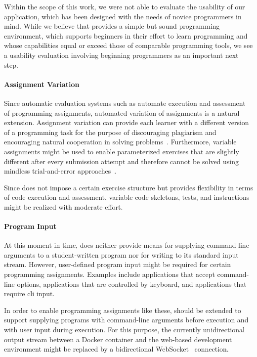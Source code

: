 Within the scope of this work, we were not able to evaluate the usability of our application, which has been designed with the needs of novice programmers in mind. While we believe that \tool provides a simple but sound programming environment, which supports beginners in their effort to learn programming and whose capabilities equal or exceed those of comparable programming tools, we see a usability evaluation involving beginning programmers as an important next step.

\paragraph{Assignment Variation}

Since automatic evaluation systems such as \tool automate execution and assessment of programming assignments, automated variation of assignments is a natural extension. Assignment variation can provide each learner with a different version of a programming task for the purpose of discouraging plagiarism and encouraging natural cooperation in solving problems~\cite{malmi2002experiences,willems2013introducing}. Furthermore, variable assignments might be used to enable parameterized exercises that are slightly different after every submission attempt and therefore cannot be solved using mindless trial-and-error approaches~\cite{ihantola2010review}.

Since \tool does not impose a certain exercise structure but provides flexibility in terms of code execution and assessment, variable code skeletons, tests, and instructions might be realized with moderate effort.

\paragraph{Program Input}

At this moment in time, \tool does neither provide means for supplying command-line arguments to a student-written program nor for writing to its standard input stream. However, user-defined program input might be required for certain programming assignments. Examples include applications that accept command-line options, applications that are controlled by keyboard, and applications that require \gls{cli} input.

In order to enable programming assignments like these, \tool should be extended to support supplying programs with command-line arguments before execution and with user input during execution. For this purpose, the currently unidirectional output stream between a Docker container and the web-based development environment might be replaced by a bidirectional WebSocket~\cite{grigorik2013high} connection.

